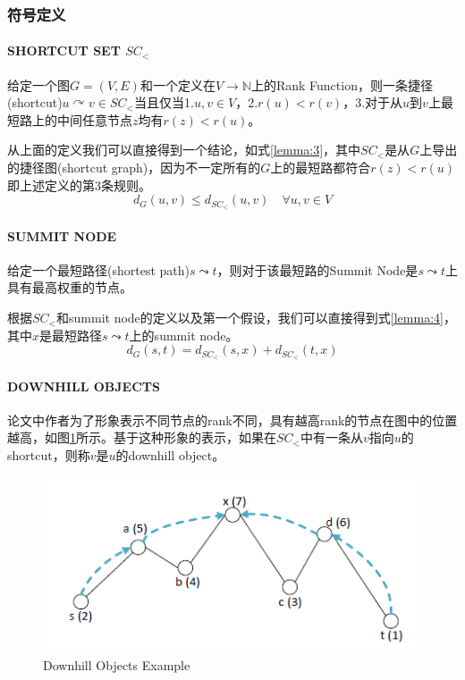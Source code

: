 \documentclass{ML}
\begin{document}

\subsubsection{符号定义}
\paragraph{SHORTCUT SET $SC_{<}$}\label{para:shortcut_set} 给定一个图$G=(V, E)$和一个定义在$V \to \mathbb{N}$上的Rank Function，则一条捷径(shortcut)$u \curvearrowright v \in SC_{<}$当且仅当1.$u, v \in V$，2.$r(u) < r(v)$，3.对于从$u$到$v$上最短路上的中间任意节点$z$均有$r(z) < r(u)$。

从上面的定义我们可以直接得到一个结论，如式\eqref{lemma:3}，其中$SC_{<}$是从$G$上导出的捷径图(shortcut graph)，因为不一定所有的$G$上的最短路都符合$r(z) < r(u)$即上述定义的第3条规则。
\begin{equation}
d_{G}(u, v) \leq d_{SC_{<}}(u, v) \quad \forall u, v \in V
\label{lemma:3}
\end{equation}
\paragraph{SUMMIT NODE}
给定一个最短路径(shortest path)$s \leadsto t$，则对于该最短路的Summit Node是$s \leadsto t$上具有最高权重的节点。

根据$SC_{<}$和summit node的定义以及第一个假设，我们可以直接得到式\eqref{lemma:4}，其中$x$是最短路径$s \leadsto t$上的summit node。
\begin{equation}
d_{G}(s, t)=d_{SC_{<}}(s, x)+d_{SC_{<}}(t, x)
\label{lemma:4}
\end{equation}
\paragraph{DOWNHILL OBJECTS}
论文中作者为了形象表示不同节点的rank不同，具有越高rank的节点在图中的位置越高，如图\ref{fig:downhill}所示。基于这种形象的表示，如果在$SC_{<}$中有一条从$v$指向$u$的shortcut，则称$v$是$u$的downhill object。
\begin{figure}[htb]
	\centering
	\includegraphics[width=0.6\linewidth]{media/downhill.png}
	\caption{Downhill Objects Example}\label{fig:downhill}
\end{figure}
\end{document}
